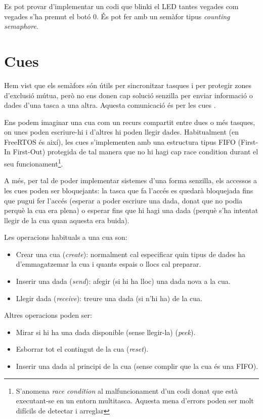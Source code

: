 \begin{exercise}
Es pot provar d'implementar un codi que blinki el LED tantes vegades com vegades s'ha premut el botó 0. És pot fer amb un semàfor tipus {\em counting semaphore}.
\end{exercise}


\section{Cues}
\label{sec:queue}
Hem vist que els semàfors són útils per sincronitzar tasques i per protegir zones d'exclusió mútua, però no ens donen cap solució senzilla per enviar informació o dades d'una tasca a una altra. Aquesta comunicació és per les cues \cite[102]{FreeRTOSBook}.

Ens podem imaginar una cua com un recurs compartit entre dues o més tasques, on unes poden escriure-hi i d'altres hi poden llegir dades. Habitualment (en FreeRTOS és així), les cues s'implementen amb una estructura tipus FIFO (First-In First-Out) protegida de tal manera que no hi hagi cap \gls{race condition} durant el seu funcionament\footnote{S'anomena {\em race condition} al malfuncionament d'un codi donat que està executant-se en un entorn multitasca. Aquesta mena d'errors poden ser molt difícils de detectar i arreglar}.

A més, per tal de poder implementar sistemes d'una forma senzilla, els accessos a les cues poden ser bloquejants: la tasca que fa l'accés es quedarà bloquejada fins que pugui fer l'accés (esperar a poder escriure una dada, donat que no podia perquè la cua era plena) o esperar fins que hi hagi una dada (perquè s'ha intentat llegir de la cua quan aquesta era buida).

Les operacions habituals a una cua son:
\begin{itemize}
 \item Crear una cua ({\em create}): normalment cal especificar quin tipus de dades ha d'emmagatzemar la cua i quants espais o llocs cal preparar.
 \item Inserir una dada ({\em send}): afegir (si hi ha lloc) una dada nova a la cua.
 \item Llegir dada ({\em receive}): treure una dada (si n'hi ha) de la cua.
\end{itemize}

Altres operacions poden ser:
\begin{itemize}
 \item Mirar si hi ha una dada disponible (sense llegir-la) ({\em peek}).
 \item Esborrar tot el contingut de la cua ({\em reset}).
 \item Inserir una dada al principi de la cua (sense complir que la cua és una FIFO).
\end{itemize}

